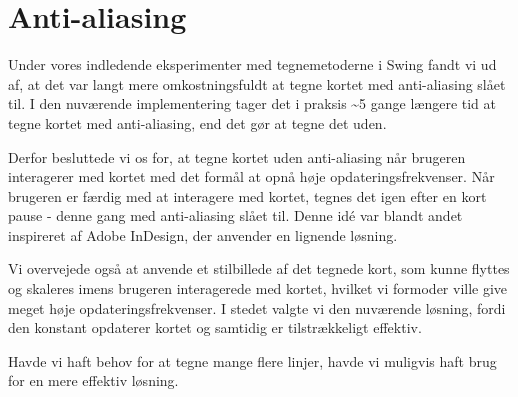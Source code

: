 \section{Anti-aliasing}

Under vores indledende eksperimenter med tegnemetoderne i Swing fandt vi ud af, at det var langt mere omkostningsfuldt at tegne kortet med anti-aliasing slået til. I den nuværende implementering tager det i praksis \textasciitilde5 gange længere tid at tegne kortet med anti-aliasing, end det gør at tegne det uden.

Derfor besluttede vi os for, at tegne kortet uden anti-aliasing når brugeren interagerer med kortet med det formål at opnå høje opdateringsfrekvenser. Når brugeren er færdig med at interagere med kortet, tegnes det igen efter en kort pause - denne gang med anti-aliasing slået til. Denne idé var blandt andet inspireret af Adobe InDesign, der anvender en lignende løsning.

Vi overvejede også at anvende et stilbillede af det tegnede kort, som kunne flyttes og skaleres imens brugeren interagerede med kortet, hvilket vi formoder ville give meget høje opdateringsfrekvenser. I stedet valgte vi den nuværende løsning, fordi den konstant opdaterer kortet og samtidig er tilstrækkeligt effektiv.

Havde vi haft behov for at tegne mange flere linjer, havde vi muligvis haft brug for en mere effektiv løsning.